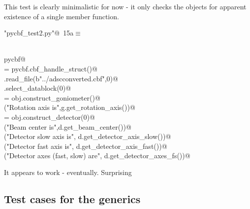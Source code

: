 \documentclass[10pt,a4paper,twoside,notitlepage]{article}
\begin{document}
This test is clearly minimalistic for now - it only checks the objects 
for apparent existence of
a single member function.

\begin{flushleft} \small
\begin{minipage}{\linewidth}\label{scrap14}\raggedright\small
{} \verb@"pycbf_test2.py"@\nobreak\ {\footnotesize {15a}}$\equiv$
\vspace{-1ex}
\begin{list}{}{} \item
\mbox{}\verb@@\\
\mbox{}\verb@import pycbf@\\
\mbox{}\verb@obj = pycbf.cbf_handle_struct()@\\
\mbox{}\verb@obj.read_file(b"../adscconverted.cbf",0)@\\
\mbox{}\verb@obj.select_datablock(0)@\\
\mbox{}\verb@g = obj.construct_goniometer()@\\
\mbox{}\verb@print("Rotation axis is",g.get_rotation_axis())@\\
\mbox{}\verb@d = obj.construct_detector(0)@\\
\mbox{}\verb@print("Beam center is",d.get_beam_center())@\\
\mbox{}\verb@print("Detector slow axis is", d.get_detector_axis_slow())@\\
\mbox{}\verb@print("Detector fast axis is", d.get_detector_axis_fast())@\\
\mbox{}\verb@print("Detector axes (fast, slow) are", d.get_detector_axes_fs())@\\
\mbox{}\verb@@{\NWsep}
\end{list}
\vspace{-1.5ex}
\footnotesize
\begin{list}{}{\setlength{\itemsep}{-\parsep}\setlength{\itemindent}{-\leftmargin}}

\item{}
\end{list}
\end{minipage}\vspace{4ex}
\end{flushleft}
It appears to work - eventually. Surprising

\subsection{Test cases for the generics}
\end{document}
